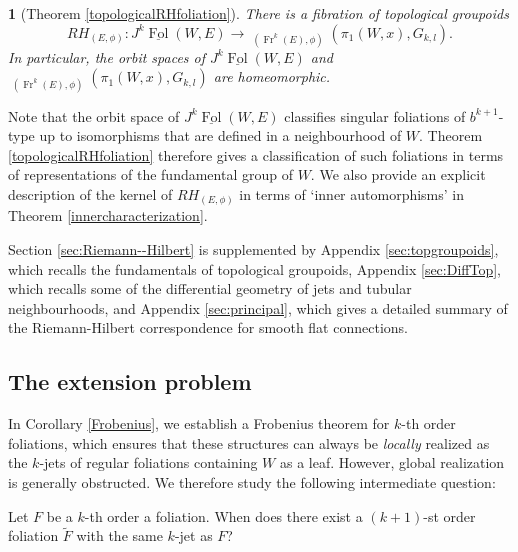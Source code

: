 \documentclass[10pt]{amsart}
\newcommand{\FolCat}{{\underline{\operatorname{Fol}}}}
\DeclareMathOperator{\Rep}{\underline{\operatorname{Rep}}}
\newcommand{\Fr}{{\operatorname{Fr}}}
\numberwithin{theoremalpha}{section}
\numberwithin{equation}{section}
\numberwithin{definition}{section}
\numberwithin{theorem}{section}
\numberwithin{proposition}{section}
\numberwithin{lemma}{section}
\numberwithin{example}{section}
\numberwithin{remark}{section}
\numberwithin{corollary}{section}
\numberwithin{question}{section}
\numberwithin{problem}{section}
\numberwithin{assumption}{section}
\theoremstyle{named}
\newtheorem*{namedtheorem}{}
\numberwithin{equation}{section}
\begin{document}
\begin{namedtheorem}[Theorem \ref{topologicalRHfoliation}]
There is a fibration of topological groupoids
\begin{equation*}
RH_{(E,\phi)} : J^{k}\FolCat(W,E) \rightarrow \Rep_{(\Fr^k(E),\phi)}(\pi_{1}(W, x), G_{k,l}). 
\end{equation*}
In particular, the orbit spaces of $J^{k}\FolCat(W,E)$ and $\Rep_{(\Fr^k(E),\phi)}(\pi_{1}(W, x), G_{k,l})$ are homeomorphic.
\end{namedtheorem}

Note that the orbit space of $J^{k}\FolCat(W,E)$ classifies singular foliations of $b^{k+1}$-type up to isomorphisms that are defined in a neighbourhood of $W$. Theorem \ref{topologicalRHfoliation} therefore gives a classification of such foliations in terms of representations of the fundamental group of $W$. We also provide an explicit description of the kernel of $RH_{(E,\phi)}$ in terms of `inner automorphisms' in Theorem \ref{innercharacterization}. 

Section \ref{sec:Riemann--Hilbert} is supplemented by Appendix \ref{sec:topgroupoids}, which recalls the fundamentals of topological groupoids, Appendix \ref{sec:DiffTop}, which recalls some of the differential geometry of jets and tubular neighbourhoods, and Appendix \ref{sec:principal}, which gives a detailed summary of the Riemann-Hilbert correspondence for smooth flat connections. 





\subsection{The extension problem}
In Corollary \ref{Frobenius}, we establish a Frobenius theorem for $k$-th order foliations, which ensures that these structures can always be \emph{locally} realized as the $k$-jets of regular foliations containing $W$ as a leaf. However, global realization is generally obstructed. We therefore study the following intermediate question: 

\begin{question}
Let $F$ be a $k$-th order a foliation. When does there exist a $(k+1)$-st order foliation $\tilde{F}$ with the same $k$-jet as $F$?
\end{question}
\end{document}

